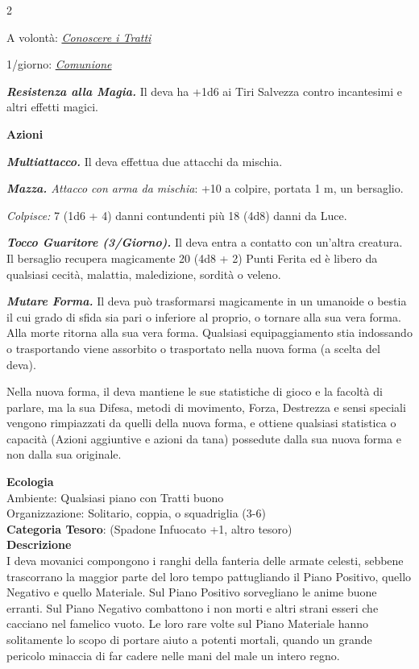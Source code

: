 \begin{multicols}{2}
{A volontà: \emph{\hyperlink{Conoscere i Tratti}{Conoscere i Tratti}}

1/giorno: \emph{\hyperlink{Comunione}{Comunione}}

\emph{\textbf{Resistenza alla Magia.}} Il deva ha +1d6 ai Tiri Salvezza contro incantesimi e altri effetti magici.

\textbf{Azioni}

\emph{\textbf{Multiattacco.}} Il deva effettua due attacchi da mischia.

\emph{\textbf{Mazza.} Attacco con arma da mischia}: +10 a colpire, portata 1 m, un bersaglio.

\emph{Colpisce:} 7 (1d6 + 4) danni contundenti più 18 (4d8) danni da Luce.

\emph{\textbf{Tocco Guaritore (3/Giorno).}} Il deva entra a contatto con un'altra creatura. Il bersaglio recupera magicamente 20 (4d8 + 2) Punti Ferita ed è libero da qualsiasi cecità, malattia, maledizione, sordità o veleno.

\emph{\textbf{Mutare Forma.}} Il deva può trasformarsi magicamente in un umanoide o bestia il cui grado di sfida sia pari o inferiore al proprio, o tornare alla sua vera forma. Alla morte ritorna alla sua vera forma. Qualsiasi equipaggiamento stia indossando o trasportando viene assorbito o trasportato nella nuova forma (a scelta del deva).

Nella nuova forma, il deva mantiene le sue statistiche di gioco e la facoltà di parlare, ma la sua Difesa, metodi di movimento, Forza, Destrezza e sensi speciali vengono rimpiazzati da quelli della nuova forma, e ottiene qualsiasi statistica o capacità (Azioni aggiuntive e azioni da tana) possedute dalla sua nuova forma e non dalla sua originale.

\textbf{Ecologia}\\
Ambiente: Qualsiasi piano con Tratti buono\\
Organizzazione: Solitario, coppia, o squadriglia (3-6)\\
\textbf{Categoria Tesoro}: (Spadone Infuocato +1, altro tesoro)\\
\textbf{Descrizione}\\
I deva movanici compongono i ranghi della fanteria delle armate celesti, sebbene trascorrano la maggior parte del loro tempo pattugliando il Piano Positivo, quello Negativo e quello Materiale. Sul Piano Positivo sorvegliano le anime buone erranti. Sul Piano Negativo combattono i non morti e altri strani esseri che cacciano nel famelico vuoto. Le loro rare volte sul Piano Materiale hanno solitamente lo scopo di portare aiuto a potenti mortali, quando un grande pericolo minaccia di far cadere nelle mani del male un intero regno.

}
\end{multicols}
